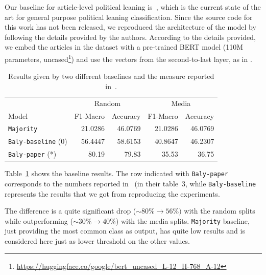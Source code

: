 Our baseline for article-level political leaning is~\citet{baly2020we}, which is the current state of the art for general purpose political leaning classification.
Since the source code for this work has not been released, we reproduced the architecture of the model by following the details provided by the authors. %
According to the details provided, we embed the articles in the dataset with a pre-trained BERT model (110M parameters, uncased\footnote{\url{https://huggingface.co/google/bert_uncased_L-12_H-768_A-12}}) and use the vectors from the second-to-last layer, as in \citet{baly2020we}. %

\begin{table}[!htbp]
    \centering
   \scriptsize
    \begin{tabular}{l|rr|rr}
        & \multicolumn{2}{c}{Random} & \multicolumn{2}{c}{Media} \\
        Model & F1-Macro & Accuracy & F1-Macro & Accuracy \\
        \hline
        \texttt{Majority} & 21.0286 & 46.0769 & 21.0286 & 46.0769 \\
        \texttt{Baly-baseline} (0) & 56.4447 & 58.6153 & 40.8647 & 46.2307 \\
        \texttt{Baly-paper} (*) & 80.19 & 79.83 & 35.53 & 36.75 \\
    \end{tabular}
    \caption{Results given by two different baselines and the measure reported in~\citet{baly2020we}.}
    \label{tab:results_baselines_classifier}
\end{table}

Table~\ref{tab:results_baselines_classifier} shows the baseline results.
The row indicated with \texttt{Baly-paper} corresponds to the numbers reported in~\citet{baly2020we} (in their table~3, while \texttt{Baly-baseline} represents the results that we got from reproducing the experiments.

The difference is a quite significant drop ($\sim80\% \rightarrow 56\%)$ with the random splits while outperforming ($\sim30\% \rightarrow 40\%$) with the media splits.
\texttt{Majority} baseline, just providing the most common class as output, has quite low results and is considered here just as lower threshold on the other values.


